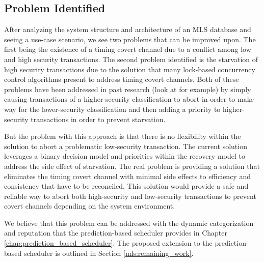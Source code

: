 \subsection{Problem Identified}
\label{mls:poblem_identified}
After analyzing the system structure and architecture of an MLS database and seeing a use-case scenario, we see two problems that can be improved upon. The first being the existence of a timing covert channel due to a conflict among low and high security transactions. The second problem identified is the starvation of high security transactions due to the solution that many lock-based concurrency control algorithms present to address timing covert channels. Both of these problems have been addressed in past research (look at \cite{samarati_database_2016} for example) by simply causing transactions of a higher-security classification to abort in order to make way for the lower-security classification and then adding a priority to higher-security transactions in order to prevent starvation.

But the problem with this approach is that there is no flexibility within the solution to abort a problematic low-security transaction. The current solution leverages a binary decision model and priorities within the recovery model to address the side effect of starvation. The real problem is providing a solution that eliminates the timing covert channel with minimal side effects to efficiency and consistency that have to be reconciled. This solution would provide a safe and reliable way to abort both high-security and low-security transactions to prevent covert channels depending on the system environment.

We believe that this problem can be addressed with the dynamic categorization and reputation that the prediction-based scheduler provides in Chapter \ref{chap:prediction_based_scheduler}. The proposed extension to the prediction-based scheduler is outlined in Section \ref{mls:remaining_work}.